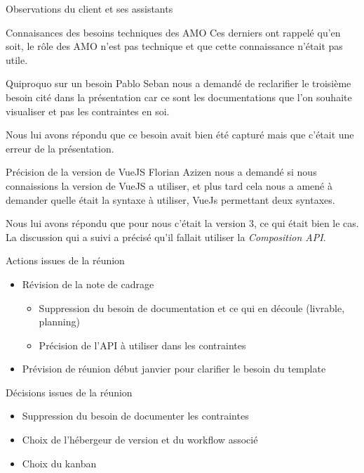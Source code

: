 \documentclass[]{article}
\begin{document}
\begin{section}{Observations du client et ses assistants}
\begin{subsection}{Connaisances des besoins techniques des AMO}
            Ces derniers ont rappelé qu'en soit, le rôle des AMO n'est pas technique et que cette connaissance n'était pas 
            utile.
        \end{subsection}

        \begin{subsection}{Quiproquo sur un besoin}
            Pablo Seban nous a demandé de reclarifier le troisième besoin cité dans la présentation car ce sont les 
            documentations que l'on souhaite visualiser et pas les contraintes en soi.

            Nous lui avons répondu que ce besoin avait bien été capturé mais que c'était une erreur de la présentation.
        \end{subsection}

        \begin{subsection}{Précision de la version de VueJS}
            Florian Azizen nous a demandé si nous connaissions la version de VueJS a utiliser, et plus tard cela nous a amené à
            demander quelle était la syntaxe à utiliser, VueJs permettant deux syntaxes.

            Nous lui avons répondu que pour nous c'était la version 3, ce qui était bien le cas. La discussion qui a suivi a 
            précisé qu'il fallait utiliser la \emph{Composition API}.
        \end{subsection}

    \end{section}

    \begin{section}{Actions issues de la réunion}
        \begin{itemize}
            \item Révision de la note de cadrage
            \begin{itemize}
                \item Suppression du besoin de documentation et ce qui en découle (livrable, planning)
                \item Précision de l'API à utiliser dans les contraintes
            \end{itemize}

            \item Prévision de réunion début janvier pour clarifier le besoin du template
        \end{itemize}
        
    \end{section}

    \begin{section}{Décisions issues de la réunion}
        \begin{itemize}
            \item Suppression du besoin de documenter les contraintes
            \item Choix de l'hébergeur de version et du workflow associé
            \item Choix du kanban
        \end{itemize}
        
    \end{section}
\end{document}
